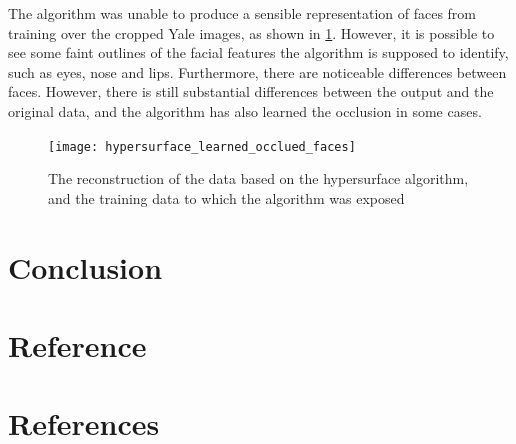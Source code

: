 \documentclass{article} %
\begin{document}
The algorithm was unable to produce a sensible representation of faces from training over the cropped Yale images, as shown in \ref{figure:hypersurface_learned_faces}. However, it is possible to see some faint outlines of the facial features the algorithm is supposed to identify, such as eyes, nose and lips.  Furthermore, there are noticeable differences between faces. However, there is still substantial differences between the output and the original data, and the algorithm has also learned the occlusion in some cases.

\begin{figure}[h]
  \texttt{[image: hypersurface\_learned\_occlued\_faces]}
  \caption{The reconstruction of the data based on the hypersurface algorithm, and the training data to which the algorithm was exposed}
  \label{figure:hypersurface_learned_faces}
\end{figure}

\section{Conclusion}

\section{Reference}

\section{References}


\end{document}
